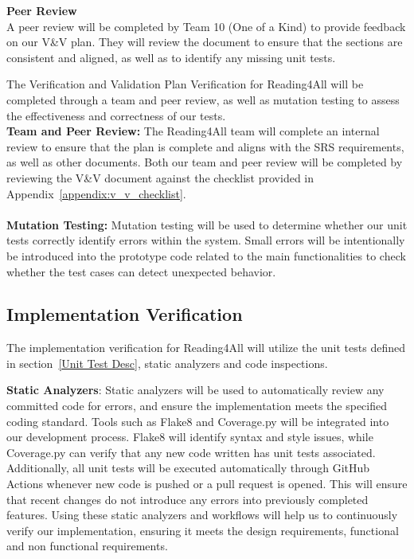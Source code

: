 \documentclass[12pt, titlepage]{article}
\begin{document}
\textbf{Peer Review}\\
A peer review will be completed by Team 10 (One of a Kind) to provide feedback on our V\&V plan. They will review the document to ensure that the sections are consistent and aligned, as well as to identify any missing unit tests.


The Verification and Validation Plan Verification for Reading4All will be completed through a team and peer review, as well as mutation testing to assess the effectiveness and correctness of our tests. \\

\textbf{Team and Peer Review:}
The Reading4All team will complete an internal review to ensure that the plan is complete and aligns with the SRS requirements, as well as other documents. 
Both our team and peer review will be completed by reviewing the V\&V document against the checklist provided in Appendix~\ref{appendix:v_v_checklist}.   \\ \\

\textbf{Mutation Testing:}
Mutation testing will be used to determine whether our unit tests correctly identify errors within the system.
Small errors will be intentionally be introduced into the prototype code related to the main functionalities to check whether the test cases can detect unexpected behavior. 


\subsection{Implementation Verification}




The implementation verification for Reading4All will utilize the unit tests defined in section~\ref{Unit Test Desc}, 
static analyzers and code inspections.

\textbf{Static Analyzers}:
Static analyzers will be used to automatically review any committed code for errors, and ensure the implementation meets the specified coding standard.
Tools such as Flake8 and Coverage.py will be integrated into our development process. Flake8 will identify syntax and style issues, while Coverage.py can verify that any new code written has unit tests associated. 
Additionally, all unit tests will be executed automatically through GitHub Actions whenever new code is pushed or a pull request is opened. This will ensure that recent changes do not introduce any errors into previously completed features. 
Using these static analyzers and workflows will help us to continuously verify our implementation, ensuring it meets the design requirements, functional and non functional requirements.
\end{document}
